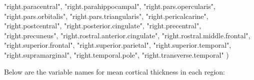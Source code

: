 \documentclass[
]{article}
\newenvironment{Shaded}{\begin{snugshade}}{\end{snugshade}}
\newcommand{\NormalTok}[1]{#1}
\newcommand{\StringTok}[1]{\textcolor[rgb]{0.31,0.60,0.02}{#1}}
\begin{document}
\begin{Shaded}
\begin{Highlighting}[]
  \StringTok{"right.paracentral"}\NormalTok{, }\StringTok{"right.parahippocampal"}\NormalTok{, }\StringTok{"right.pars.opercularis"}\NormalTok{,}
  \StringTok{"right.pars.orbitalis"}\NormalTok{, }\StringTok{"right.pars.triangularis"}\NormalTok{, }\StringTok{"right.pericalcarine"}\NormalTok{,}
  \StringTok{"right.postcentral"}\NormalTok{, }\StringTok{"right.posterior.cingulate"}\NormalTok{, }\StringTok{"right.precentral"}\NormalTok{,}
  \StringTok{"right.precuneus"}\NormalTok{, }\StringTok{"right.rostral.anterior.cingulate"}\NormalTok{, }\StringTok{"right.rostral.middle.frontal"}\NormalTok{,}
  \StringTok{"right.superior.frontal"}\NormalTok{, }\StringTok{"right.superior.parietal"}\NormalTok{, }\StringTok{"right.superior.temporal"}\NormalTok{,}
  \StringTok{"right.supramarginal"}\NormalTok{, }\StringTok{"right.temporal.pole"}\NormalTok{, }\StringTok{"right.transverse.temporal"}
\NormalTok{                  )}
\end{Highlighting}
\end{Shaded}

Below are the variable names for mean cortical thickness in each region:
\end{document}
